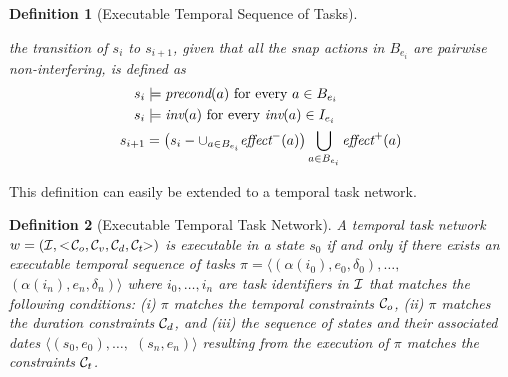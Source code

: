 \documentclass[letterpaper]{article} %
\newtheorem{definition}{Definition}
\newcommand{\pre}{\text{\it precond}}
\newcommand{\add}{\text{\it effect}^{+}}
\newcommand{\del}{\text{\it effect}^{-}}
\newcommand{\tstart}{\text{\it start}}
\newcommand{\tend}{\text{\it end}}
\newcommand{\tinv}{\text{\it inv}}
\begin{document}
\begin{definition}[Executable Temporal Sequence of Tasks]
\begin{itemize}
    the transition of $s_i$ to  $s_{i+1}$, given that all the snap actions in $B_{e_i}$ are \emph{pairwise non-interfering}, is defined as   %
      \begin{align*}
       s_i& \models \pre(a) \text{ for every } a \in B_{e_i}\\
       s_i& \models \tinv(a) \text{ for every }\tinv(a) \in I_{e_i}\\
       s_{i+1}& = \left(s_i - \cup_{a \in B_{e_i}} \del(a)\right) \bigcup_{a \in B_{e_i}} \add(a)       
      \end{align*}
\end{itemize}
%
%
\end{definition}


 This definition can easily be extended to a temporal task network.

  \begin{definition}[Executable Temporal Task Network] A temporal task network $w = ({\cal{I}}, <\!{\cal{C}}_o, {\cal{C}}_v, {\cal{C}}_d, {\cal{C}}_t\!\!>)$ is executable in a state $s_0$ if and only if there exists an executable temporal sequence of tasks $\pi = \langle (\alpha(i_0), e_0, \delta_0), \ldots,$ $(\alpha(i_n), e_n, \delta_n)\rangle$  where $i_0, \ldots, i_n$ are task identifiers in $\cal{I}$ that matches the following conditions: (i) $\pi$ matches the temporal constraints ${\cal{C}}_o$, (ii) $\pi$ matches the duration constraints ${\cal{C}}_d$, and (iii) the sequence of states and their associated dates $\langle (s_0, e_0), \ldots,$ $(s_n, e_n) \rangle$ resulting from the execution of $\pi$ matches the constraints ${\cal{C}}_t$.
  \end{definition}
\end{document}

